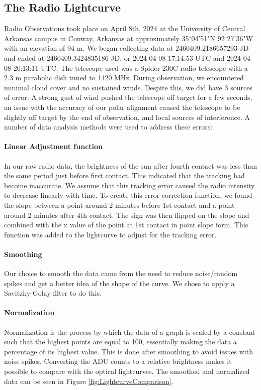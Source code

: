 \subsection{\label{sec:radio}The Radio Lightcurve}
Radio Observations took place on April 8th, 2024 at the University of Central Arkansas campus in Conway, Arkansas at approximately 35$^\circ$04'51"N 92$^\circ$27'36"W with an elevation of 94 m.
We began collecting data at 2460409.2186657293 JD and ended at 2460409.3424835186 JD, or 2024-04-08 17:14:53 UTC and 2024-04-08 20:13:11 UTC.
The telescope used was a Spider 230C radio telescope with a 2.3 m parabolic dish tuned to 1420 MHz.
During observation, we encountered minimal cloud cover and no sustained winds.
Despite this, we did have 3 sources of error: A strong gust of wind pushed the telescope off target for a few seconds, an issue with the accuracy of our polar alignment caused the telescope to be slightly off target by the end of observation, and local sources of interference.
A number of data analysis methods were used to address these errors:
\paragraph{Linear Adjustment function}
In our raw radio data, the brightness of the sun after fourth contact was less than the same period just before first contact.
This indicated that the tracking had become inaccurate.
We assume that this tracking error caused the radio intensity to decrease linearly with time.
To create this error correction function, we found the slope between a point around 2 minutes before 1st contact and a point around 2 minutes after 4th contact. 
The sign was then flipped on the slope and combined with the x value of the point at 1st contact in point slope form.
This function was added to the lightcurve to adjust for the tracking error.
\paragraph{Smoothing}
Our choice to smooth the data came from the need to reduce noise/random spikes and get a better idea of the shape of the curve.
We chose to apply a Savitzky-Golay filter \cite{savitzky_golay_1964} to do this.


\paragraph{Normalization}
Normalization is the process by which the data of a graph is scaled by a constant such that the highest points are equal to 100, essentially making the data a percentage of its highest value.
This is done after smoothing to avoid issues with noise spikes.
Converting the ADU counts to a relative brightness makes it possible to compare with the optical lightcurves.
The smoothed and normalized data can be seen in Figure \ref{fig:LightcurveComparison}.


